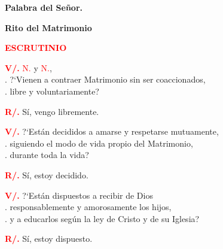 \documentclass[12pt, letterpaper]{report}
\begin{document}
  {\bfseries Palabra del Se\~nor.}

  \clearpage

  \begin{center}
    \Huge {\bfseries Rito del Matrimonio}
  \end{center}

  \Large {\bfseries \textcolor{red}{ESCRUTINIO}}

  \Large \hspace{-0.9cm} {\bfseries \textcolor{red}{V/.}} \hspace{0.5cm}  \textcolor{red}{N.} y \textcolor{red}{N.}, \\
  . \hspace{1cm} ?`Vienen a contraer Matrimonio sin ser coaccionados, \\
  . \hspace{1cm} libre y voluntariamente?

  \Large \hspace{-0.9cm} {\bfseries \textcolor{red}{R/.}} \hspace{0.5cm} S\'i, vengo libremente.

  \Large \hspace{-0.9cm}  {\bfseries \textcolor{red}{V/.}} \hspace{0.5cm} ?`Est\'an decididos a amarse y respetarse mutuamente, \\
  . \hspace{1cm} siguiendo el modo de vida propio del Matrimonio, \\
  . \hspace{1cm} durante toda la vida?

  \Large \hspace{-0.9cm} {\bfseries \textcolor{red}{R/.}} \hspace{0.5cm} S\'i, estoy decidido.

  \Large \hspace{-0.9cm} {\bfseries \textcolor{red}{V/.}} \hspace{0.5cm} ?`Est\'an dispuestos a recibir de Dios \\
  . \hspace{1cm} responsablemente y amorosamente los hijos, \\
  . \hspace{1cm} y a educarlos seg\'un la ley de Cristo y de su Iglesia?

  \Large \hspace{-0.9cm} {\bfseries \textcolor{red}{R/.}} \hspace{0.5cm} S\'i, estoy dispuesto.
\end{document}
